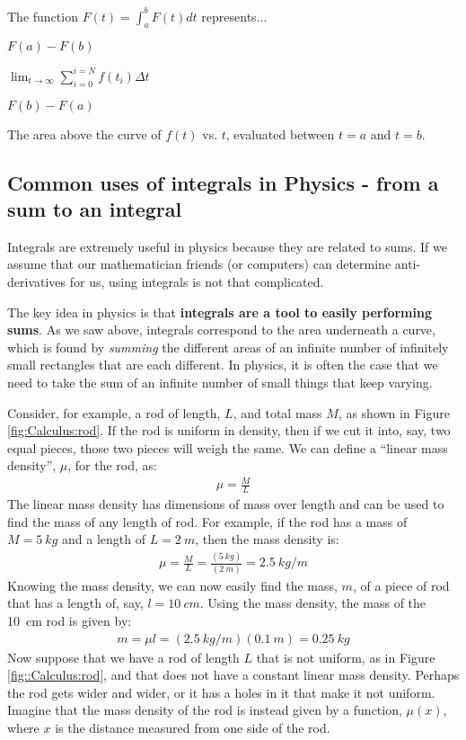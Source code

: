 \begin{checkpoint}
\begin{MCquestion}
{The function $F(t)=\int_{a}^{b}F(t)dt$ represents...}
\item $F(a)-F(b)$
\item $\lim_{t\to\infty}\sum_{i=0}^{i=N}f(t_i)\Delta t$
\item $F(b)-F(a)$
\item The area above the curve of $f(t)$ vs. $t$, evaluated between $t=a$ and $t=b$.
\end{MCquestion}
\end{checkpoint}

\subsection{Common uses of integrals in Physics - from a sum to an integral}
Integrals are extremely useful in physics because they are related to sums. If we assume that our mathematician friends (or computers) can determine anti-derivatives for us, using integrals is not that complicated. 

The key idea in physics is that \textbf{integrals are a tool to easily performing sums}. As we saw above, integrals correspond to the area underneath a curve, which is found by \textit{summing} the different areas of an infinite number of infinitely small rectangles that are each different. In physics, it is often the case that we need to take the sum of an infinite number of small things that keep varying. 

Consider, for example, a rod of length, $L$, and total mass $M$, as shown in Figure \ref{fig:Calculus:rod}. If the rod is uniform in density, then if we cut it into, say, two equal pieces, those two pieces will weigh the same. We can define a ``linear mass density'', $\mu$, for the rod, as:
\begin{align*}
\mu = \frac{M}{L}
\end{align*} 
The linear mass density has dimensions of mass over length and can be used to find the mass of any length of rod. For example, if the rod has a mass of $M=\SI{5}{kg}$ and a length of $L=\SI{2}{m}$, then the mass density is:
\begin{align*}
\mu=\frac{M}{L}=\frac{(\SI{5}{kg})}{(\SI{2}{m})}=\SI{2.5}{kg/m}
\end{align*}
Knowing the mass density, we can now easily find the mass, $m$, of a piece of rod that has a length of, say, $l=\SI{10}{cm}$. Using the mass density, the mass of the \SI{10}{cm} rod is given by:
\begin{align*}
m=\mu l=(\SI{2.5}{kg/m})(\SI{0.1}{m})=\SI{0.25}{kg}
\end{align*}
Now suppose that we have a rod of length $L$ that is not uniform, as in Figure \ref{fig::Calculus:rod}, and that does not have a constant linear mass density. Perhaps the rod gets wider and wider, or it has a holes in it that make it not uniform. Imagine that the mass density of the rod is instead given by a function, $\mu(x)$, where $x$ is the distance measured from one side of the rod. 

